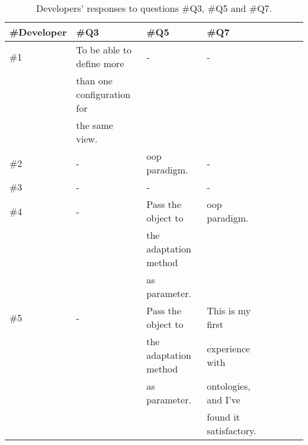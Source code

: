 \begin{table}
  \caption{Developers' responses to questions \#Q3, \#Q5 and \#Q7.}
 \label{tbl:developers_responses_2}
\footnotesize
\centering
 \begin{tabular}{l l l l l l l l}
  \hline 
  \textbf{\#Developer} 	& \textbf{\#Q3} 		& \textbf{\#Q5} 	& \textbf{\#Q7}	\\
  \hline
  \#1			& To be able to define more	& -			& -		\\
			& than one configuration for 	& 			& 		\\
			& the same view.		& 			& 		\\
  \#2			& -				& \acs{oop} paradigm.	& -		\\
  \#3			& -				& -			& -		\\
  \#4			& - 				& Pass the object to	& \acs{oop} paradigm.	\\
			&				& the adaptation method & 		\\
			&				& as parameter.		& 		\\
  \#5			& -				& Pass the object to	& This is my first \\
			& 				& the adaptation method	& experience with  \\
			& 				& as parameter.		& ontologies, and I've \\
			&				&			& found it satisfactory. \\
  \hline
\end{tabular}
\end{table}


